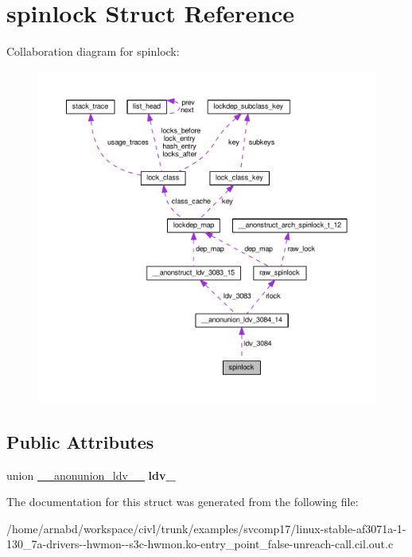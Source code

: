 \hypertarget{structspinlock}{}\section{spinlock Struct Reference}
\label{structspinlock}


Collaboration diagram for spinlock\+:
\nopagebreak
\begin{figure}[H]
\begin{center}
\leavevmode
\includegraphics[width=350pt]{structspinlock__coll__graph}
\end{center}
\end{figure}
\subsection*{Public Attributes}
\begin{DoxyCompactItemize}
\item 
\hypertarget{structspinlock_a78b866bcb636fd4502d21250ddabbd34}{}union \hyperlink{union____anonunion__ldv__3084__14}{\+\_\+\+\_\+anonunion\+\_\+ldv\+\_\+\_} {\bfseries ldv\+\_}\label{structspinlock_a78b866bcb636fd4502d21250ddabbd34}

\end{DoxyCompactItemize}


The documentation for this struct was generated from the following file\+:\begin{DoxyCompactItemize}
\item 
/home/arnabd/workspace/civl/trunk/examples/svcomp17/linux-\/stable-\/af3071a-\/1-\/130\+\_\+7a-\/drivers-\/-\/hwmon-\/-\/s3c-\/hwmon.\+ko-\/entry\+\_\+point\+\_\+false-\/unreach-\/call.\+cil.\+out.\+c\end{DoxyCompactItemize}
